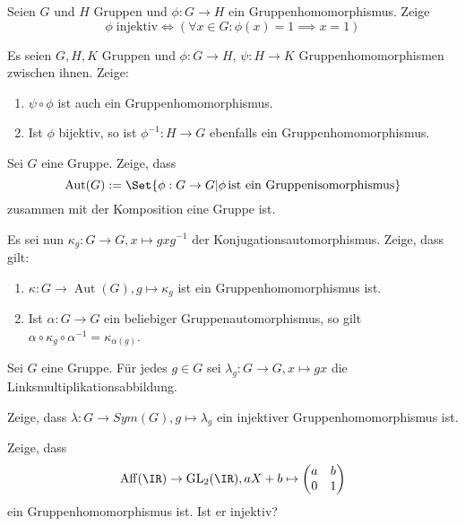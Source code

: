 \begin{sheet}
\begin{problem}[title={Injektiv = trivialer Kern}]
Seien $G$ und $H$ Gruppen und $\phi:G\to H$ ein Gruppenhomomorphismus. Zeige
\[\phi\;\text{injektiv} \iff (\forall x\in G: \phi(x)=1 \implies x=1)\]
\end{problem}

\begin{problem}
Es seien $G,H,K$ Gruppen und $\phi: G\to H$, $\psi: H\to K$ Gruppenhomomorphismen zwischen ihnen. Zeige:

\begin{enumerate}
\item $\psi\circ\phi$ ist auch ein Gruppenhomomorphismus.
\item Ist $\phi$ bijektiv, so ist $\phi^{-1}:H\to G$ ebenfalls ein Gruppenhomomorphismus.
\end{enumerate}
\end{problem}

\begin{problem}
Sei $G$ eine Gruppe. Zeige, dass
\[\operatorname{Aut}(G) := \Set{\phi: G\to G | \phi\,\text{ist ein Gruppenisomorphismus}}\]
zusammen mit der Komposition eine Gruppe ist.

Es sei nun $\kappa_g: G\to G, x\mapsto gxg^{-1}$ der Konjugationsautomorphismus. Zeige, dass gilt:
\begin{enumerate}
\item $\kappa: G\to\operatorname{Aut}(G), g\mapsto\kappa_g$ ist ein Gruppenhomomorphismus ist.
\item Ist $\alpha: G\to G$ ein beliebiger Gruppenautomorphismus, so gilt $\alpha\circ\kappa_g\circ\alpha^{-1} = \kappa_{\alpha(g)}$.
\end{enumerate}
\end{problem}

\begin{problem}[title={Cayley-Einbettung; \enquote{Jede Gruppe ist eine Permutationsgruppe}}]
Sei $G$ eine Gruppe. Für jedes $g\in G$ sei $\lambda_g: G\to G, x\mapsto gx$ die Linksmultiplikationsabbildung.

Zeige, dass $\lambda: G\to Sym(G), g\mapsto\lambda_g$ ein injektiver Gruppenhomomorphismus ist.
\end{problem}

\begin{problem}
Zeige, dass
\[\operatorname{Aff}(\IR)\to\operatorname{GL}_2(\IR), aX+b \mapsto \begin{pmatrix} a & b \\ 0 & 1 \end{pmatrix}\]
ein Gruppenhomomorphismus ist. Ist er injektiv?
\end{problem}


\end{sheet}
